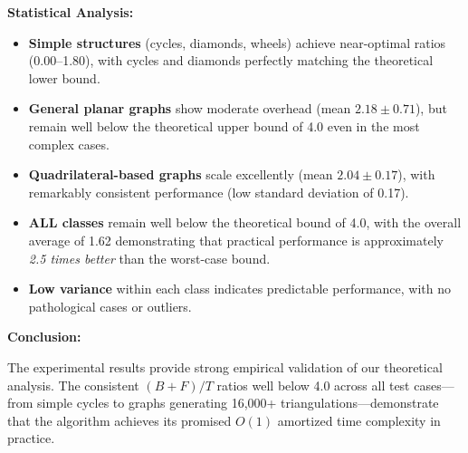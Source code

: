 \documentclass[12pt,a4paper]{article}
\theoremstyle{definition}
\theoremstyle{remark}
\begin{document}
\textbf{Statistical Analysis:}
\begin{itemize}
    \item \textbf{Simple structures} (cycles, diamonds, wheels) achieve near-optimal ratios (0.00--1.80), with cycles and diamonds perfectly matching the theoretical lower bound.
    
    \item \textbf{General planar graphs} show moderate overhead (mean $2.18 \pm 0.71$), but remain well below the theoretical upper bound of 4.0 even in the most complex cases.
    
    \item \textbf{Quadrilateral-based graphs} scale excellently (mean $2.04 \pm 0.17$), with remarkably consistent performance (low standard deviation of 0.17).
    
    \item \textbf{ALL classes} remain well below the theoretical bound of 4.0, with the overall average of 1.62 demonstrating that practical performance is approximately \emph{2.5 times better} than the worst-case bound.
    
    \item \textbf{Low variance} within each class indicates predictable performance, with no pathological cases or outliers.
\end{itemize}

\textbf{Conclusion:}

The experimental results provide strong empirical validation of our theoretical analysis. The consistent $(B+F)/T$ ratios well below 4.0 across all test cases—from simple cycles to graphs generating 16,000+ triangulations—demonstrate that the algorithm achieves its promised $O(1)$ amortized time complexity in practice.
\end{document}
